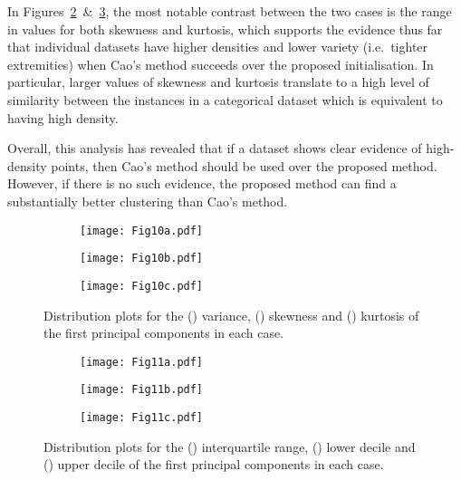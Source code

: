 In Figures~\ref{fig:edo_skewness}~\&~\ref{fig:edo_kurtosis}, the most notable
contrast between the two cases is the range in values for both skewness and
kurtosis, which supports the evidence thus far that individual datasets have
higher densities and lower variety (i.e.\ tighter extremities) when Cao's method
succeeds over the proposed initialisation. In particular, larger values of
skewness and kurtosis translate to a high level of similarity between the
instances in a categorical dataset which is equivalent to having high density.

Overall, this analysis has revealed that if a dataset shows clear evidence of
high-density points, then Cao's method should be used over the proposed method.
However, if there is no such evidence, the proposed method can find a
substantially better clustering than Cao's method.

\begin{figure}
    \centering
    \begin{subfigure}{\imgwidth}
        \texttt{[image: Fig10a.pdf]}%
        \caption{}\label{fig:edo_variance}
    \end{subfigure}

    \begin{subfigure}{\imgwidth}
        \texttt{[image: Fig10b.pdf]}%
    \caption{}\label{fig:edo_skewness}
    \end{subfigure}

    \begin{subfigure}{\imgwidth}
        \texttt{[image: Fig10c.pdf]}%
        \caption{}\label{fig:edo_kurtosis}
    \end{subfigure}
    \caption{Distribution plots for the () variance,
        () skewness and ()
        kurtosis of the first principal components in each
        case.}\label{fig:edo_moments}
\end{figure}

\begin{figure}
    \centering
    \begin{subfigure}{\imgwidth}
        \texttt{[image: Fig11a.pdf]}
        \caption{}\label{fig:edo_iqr}
    \end{subfigure}\vfill%

    \begin{subfigure}{\imgwidth}
        \texttt{[image: Fig11b.pdf]}
        \caption{}\label{fig:edo_lower}
    \end{subfigure}\vfill%

    \begin{subfigure}{\imgwidth}
        \texttt{[image: Fig11c.pdf]}
        \caption{}\label{fig:edo_upper}
    \end{subfigure}
    \caption{Distribution plots for the () interquartile
        range, () lower decile and
        () upper decile of the first principal components
        in each case.}\label{fig:edo_quantiles}
\end{figure}



